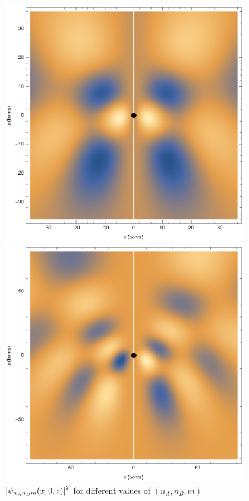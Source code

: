\documentclass{beamer}
\theoremstyle{definition}
\begin{document}
\begin{frame}
\begin{figure}[!htb]
\begin{minipage}{0.24\textwidth}
\caption*{$(2,0,0)$}
\end{minipage}
\begin{minipage}{0.24\textwidth}
\includegraphics[width=0.95\textwidth]{figures/212.eps}
\caption*{$(2,1,2)$}
\end{minipage}
\begin{minipage}{0.24\textwidth}
\includegraphics[width=0.95\textwidth]{figures/413.eps}
\caption*{$(4,1,3)$}
\end{minipage}
\caption{$\abs{\psi_{n_An_Bm}(x,0,z)}^2$ for different values of  $(n_A, n_B, m)$}
\end{figure}

\end{frame}
\end{document}
